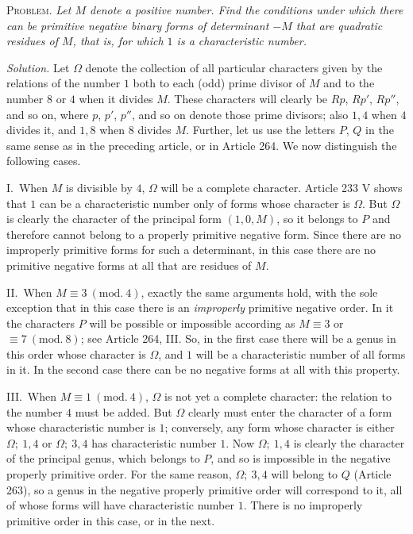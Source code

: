 \textsc{Problem.} \textit{Let $M$ denote a positive number. Find the
conditions under which there can be primitive negative binary forms of
determinant $-M$ that are quadratic residues of $M$, that is, for which
$1$ is a characteristic number.}

\textit{Solution.} Let $\Omega$ denote the collection of all particular
characters given by the relations of the number $1$ both to each
(odd) prime divisor of $M$ and to the number $8$ or $4$
when it divides $M$. These characters will clearly be $Rp$,
$Rp'$, $Rp''$, and so on, where $p$, $p'$, $p''$, and so on
denote those prime divisors; also $1,4$ when $4$ divides it, and
$1,8$ when $8$ divides $M$. Further, let us use the letters
$P$, $Q$ in the same sense as in the preceding article, or in
Article 264. We now distinguish the following cases.

I.\ When $M$ is divisible by $4$, $\Omega$ will be a complete
character. Article 233 V shows that $1$ can be a characteristic
number only of forms whose character is $\Omega$. But $\Omega$ is
clearly the character of the principal form $(1,0,M)$, so it belongs to
$P$ and therefore cannot belong to a properly primitive negative
form. Since there are no improperly primitive forms for such a determinant,
in this case there are no primitive negative forms at all that are
residues of $M$.

II.\ When $M\equiv3\ (\mathrm{mod.}\ 4)$, exactly the same arguments hold, with the sole
exception that in this case there is an \textit{improperly} primitive
negative order. In it the characters $P$ will be possible or
impossible according as $M\equiv3$ or $\equiv7\ (\mathrm{mod.}\ 8)$; see Article 264, III.
So, in the first case there will be a genus in this order whose character
is $\Omega$, and $1$ will be a characteristic number of all forms
in it. In the second case there can be no negative forms at all with
this property.

III.\ When $M\equiv1\ (\mathrm{mod.}\ 4)$, $\Omega$ is not yet a complete character: the
relation to the number $4$ must be added. But $\Omega$ clearly
must enter the character of a form whose characteristic number is
$1$; conversely, any form whose character is either $\Omega;\ 1,4$ or
$\Omega;\ 3,4$ has characteristic number $1$. Now $\Omega;\ 1,4$ is clearly
the character of the principal genus, which belongs to $P$, and
so is impossible in the negative properly primitive order. For the same
reason, $\Omega;\ 3,4$ will belong to $Q$ (Article 263), so a genus in
the negative properly primitive order will correspond to it, all of
whose forms will have characteristic number $1$. There is no
improperly primitive order in this case, or in the next.

